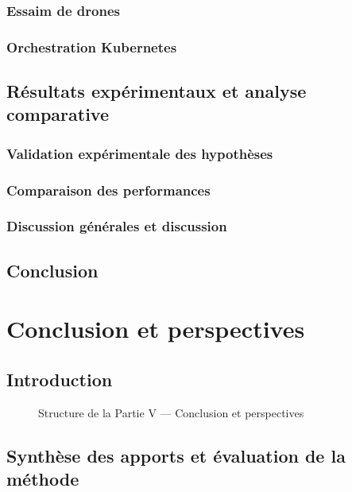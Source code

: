 \documentclass[ twoside,openright,titlepage,numbers=noenddot,headinclude,%
                footinclude=true,cleardoublepage=empty,abstractoff, %
                BCOR=5mm,paper=a4,fontsize=11pt,%
                french,american,%
                ]{scrreprt}
\begin{document}
\section{Essaim de drones}
\section{Orchestration Kubernetes}

\chapter{Résultats expérimentaux et analyse comparative}
\section{Validation expérimentale des hypothèses}
\section{Comparaison des performances}
\section{Discussion générales et discussion}

\chapter*{Conclusion}


\part{Conclusion et perspectives}

\chapter*{Introduction}


\begin{figure}[h!]
    \centering
    
    \caption{Structure de la Partie V — Conclusion et perspectives}
\end{figure}

\chapter{Synthèse des apports et évaluation de la méthode}
\end{document}
